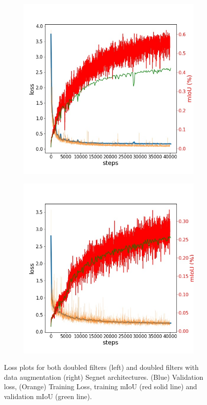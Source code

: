 \documentclass[12pt,a4paper]{article}
\begin{document}
\begin{figure}
\centering
\begin{subfigure}{.5\textwidth}
  \centering
  \includegraphics[width=.95\linewidth]{seg_res_1.jpg}
\end{subfigure}%
\begin{subfigure}{.5\textwidth}
  \centering
  \includegraphics[width=.95\linewidth]{seg_res_2.jpg}
\end{subfigure}
\caption{Loss plots for both doubled filters (left) and doubled filters with data augmentation (right) Segnet architectures. (Blue) Validation loss, (Orange) Training Loss,  training mIoU (red solid line) and validation mIoU (green line). }
\label{segnet:filters}
\end{figure}
\end{document}
